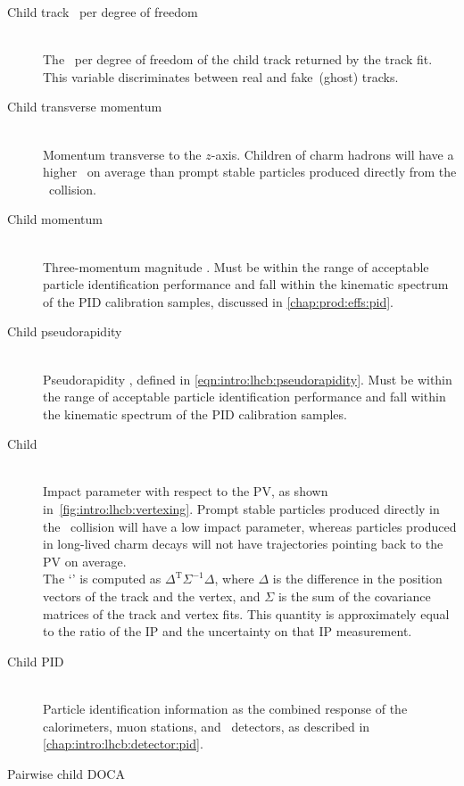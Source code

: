 \begin{description}
  \item[Child track \chisq\ per degree of freedom] \hfill \\
    The \chisq\ per degree of freedom of the child track returned by the track 
    fit.
    This variable discriminates between real and fake~(ghost) tracks.
  \item[Child transverse momentum] \hfill \\
    Momentum transverse to the $z$-axis.
    Children of charm hadrons will have a higher \pT\ on average than prompt 
    stable particles produced directly from the \pp\ collision.
  \item[Child momentum] \hfill \\
    Three-momentum magnitude \ptot.
    Must be within the range of acceptable particle identification performance 
    and fall within the kinematic spectrum of the \ac{PID} calibration samples, 
    discussed in \cref{chap:prod:effs:pid}.
  \item[Child pseudorapidity] \hfill \\
    Pseudorapidity \Eta, defined in \cref{eqn:intro:lhcb:pseudorapidity}.
    Must be within the range of acceptable particle identification performance 
    and fall within the kinematic spectrum of the \ac{PID} calibration samples.
  \item[Child \ipchisq] \hfill \\
    Impact parameter with respect to the \ac{PV}, as shown 
    in~\cref{fig:intro:lhcb:vertexing}.
    Prompt stable particles produced directly in the \pp\ collision will have a 
    low impact parameter, whereas particles produced in long-lived charm decays 
    will not have trajectories pointing back to the \ac{PV} on average.\\
    The `\chisq' is computed as $\Delta^{\text{T}}\Sigma^{-1}\Delta$, where 
    $\Delta$ is the difference in the position vectors of the track and the 
    vertex, and $\Sigma$ is the sum of the covariance matrices of the track and 
    vertex fits.
    This quantity is approximately equal to the ratio of the \ac{IP} and the 
    uncertainty on that \ac{IP} measurement.
  \item[Child \ac{PID}] \hfill \\
    Particle identification information as the combined response of the 
    calorimeters, muon stations, and \rich\ detectors, as described in 
    \cref{chap:intro:lhcb:detector:pid}.
  \item[Pairwise child \ac{DOCA}] \hfill \\

\end{description}
